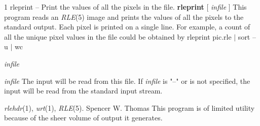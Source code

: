 %
%
%
 1
rleprint -- Print the values of all the pixels in the file.
{\bf rleprint}
[ 
{\it infile}
]
This program reads an
{\it RLE}{\rm (5)}
image and prints the values of all the pixels to the standard output.
Each pixel is printed on a single line.  For example, a count of all
the unique pixel values in the file could be obtained by
\nwl
rleprint pic.rle $|$ sort --u $|$ wc
\begin{TPlist}{{\it infile}}
\item[{{\it infile}}]
The input will be read from this file.  If
{\it infile}
is "--" or is not specified, the input will be read from the standard
input stream.
\end{TPlist}
{\it rlehdr}{\rm (1),}
{\it urt}{\rm (1),}
{\it RLE}{\rm (5).}
Spencer W. Thomas
This program is of limited utility because of the sheer volume of
output it generates.
\newpage



